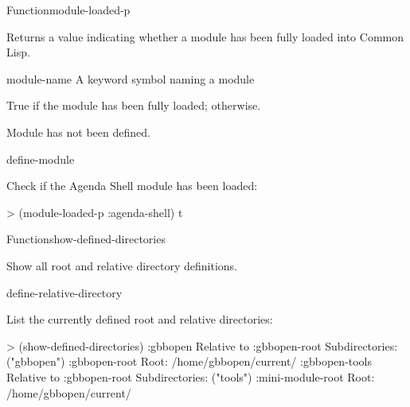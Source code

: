 \documentclass[10pt,twoside,english,pdftex]{article}
\begin{document}
\begin{functiondoc}{Function}{module-loaded-p}{
    \returns{} }
%
%

\fnsyntax 

\fnpurpose Returns a value indicating whether a module has been fully
loaded into Common Lisp.

\fnpackage {}

\fnmodule {}

\fnargs
\begin{args}{module-name}
 A keyword symbol naming a module 
\end{args}

\fnreturns True if the module has been fully loaded; \nil{} otherwise.

\fnerrors
Module  has not been defined.

\begin{alsos}{define-module}
\end{alsos}

\fnexample
Check if the Agenda Shell module has been loaded:
\begin{example}
> (module-loaded-p :agenda-shell)
t
\end{example} 

\end{functiondoc}


\begin{functiondoc}{Function}{show-defined-directories}{\noargs}
%
%

\fnsyntax

\fnpurpose Show all root and relative directory definitions.

\fnpackage {}

\fnmodule {}

\begin{alsos}{define-relative-directory}
\end{alsos}

\fnexample List the currently defined root and relative directories:
\begin{example}
> (show-defined-directories)
:gbbopen
    Relative to :gbbopen-root
    Subdirectories: ("gbbopen")
:gbbopen-root
    Root: /home/gbbopen/current/
:gbbopen-tools
    Relative to :gbbopen-root
    Subdirectories: ("tools")
:mini-module-root
    Root: /home/gbbopen/current/
\end{example}

\end{functiondoc}
\end{document}
